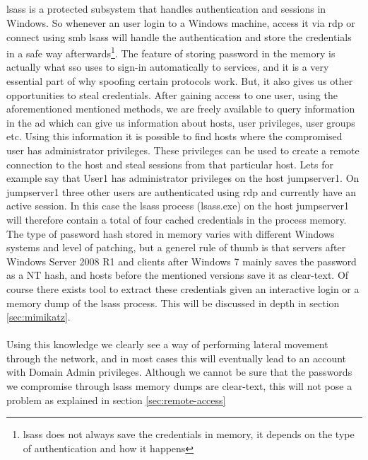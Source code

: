 \documentclass{article}
\begin{document}
\subsection{}
\label{sec:lsass}
\gls{lsass} is a protected subsystem that handles authentication and sessions in Windows. So whenever an user login to a Windows machine, access it via \gls{rdp} or connect using \gls{smb} \gls{lsass} will handle the authentication and store the credentials in a safe way afterwards\footnote{\gls{lsass} does not always save the credentials in memory, it depends on the type of authentication and how it happens\cite{url:lsass:cred-in-memory}}.
The feature of storing password in the memory is actually what \gls{sso} uses to sign-in automatically to services, and it is a very essential part of why spoofing certain protocols work. But, it also gives us other opportunities to steal credentials. After gaining access to one user, using the aforementioned mentioned methods, we are freely available to query information in the \gls{ad} which can give us information about hosts, user privileges, user groups etc. Using this information it is possible to find hosts where the compromised user has administrator privileges. These privileges can be used to create a remote connection to the host and steal sessions from that particular host. Lets for example say that User1 has administrator privileges on the host jumpserver1. On jumpserver1 three other users are authenticated using \gls{rdp} and currently have an active session. In this case the \gls{lsass} process (lsass.exe) on the host jumpserver1 will therefore contain a total of four cached credentials in the process memory. The type of password hash stored in memory varies with different Windows systems and level of patching, but a generel rule of thumb is that servers after Windows Server 2008 R1 and clients after Windows 7 mainly saves the password as a NT hash, and hosts before the mentioned versions save it as clear-text\cite{url:lsass:clear-text-2008}. Of course there exists tool to extract these credentials given an interactive login or a memory dump of the \gls{lsass} process. This will be discussed in depth in section \ref{sec:mimikatz}.
\\\\
Using this knowledge we clearly see a way of performing lateral movement through the network, and in most cases this will eventually lead to an account with Domain Admin privileges. Although we cannot be sure that the passwords we compromise through \gls{lsass} memory dumps are clear-text, this will not pose a problem as explained in section \ref{sec:remote-access}
\end{document}
